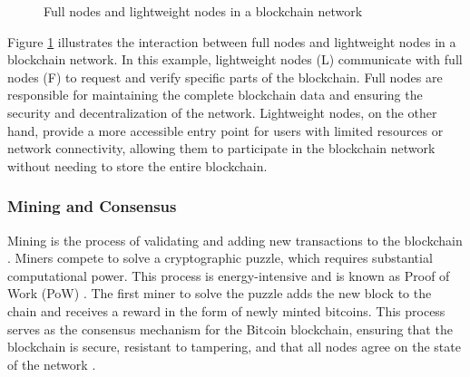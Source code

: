 \begin{figure}[ht]
    \centering
    \caption{Full nodes and lightweight nodes in a blockchain network}
    \label{fig:nodes}
\end{figure}

Figure \ref{fig:nodes} illustrates the interaction between full nodes and lightweight nodes in a blockchain network. In this example, lightweight nodes (L) communicate with full nodes (F) to request and verify specific parts of the blockchain. Full nodes are responsible for maintaining the complete blockchain data and ensuring the security and decentralization of the network. Lightweight nodes, on the other hand, provide a more accessible entry point for users with limited resources or network connectivity, allowing them to participate in the blockchain network without needing to store the entire blockchain.

\subsubsection{Mining and Consensus}
Mining is the process of validating and adding new transactions to the blockchain \cite{antonopoulos2014mastering}. Miners compete to solve a cryptographic puzzle, which requires substantial computational power. This process is energy-intensive and is known as Proof of Work (PoW) \cite{nakamoto2008bitcoin}. The first miner to solve the puzzle adds the new block to the chain and receives a reward in the form of newly minted bitcoins. This process serves as the consensus mechanism for the Bitcoin blockchain, ensuring that the blockchain is secure, resistant to tampering, and that all nodes agree on the state of the network \cite{swan2015blockchain}.


